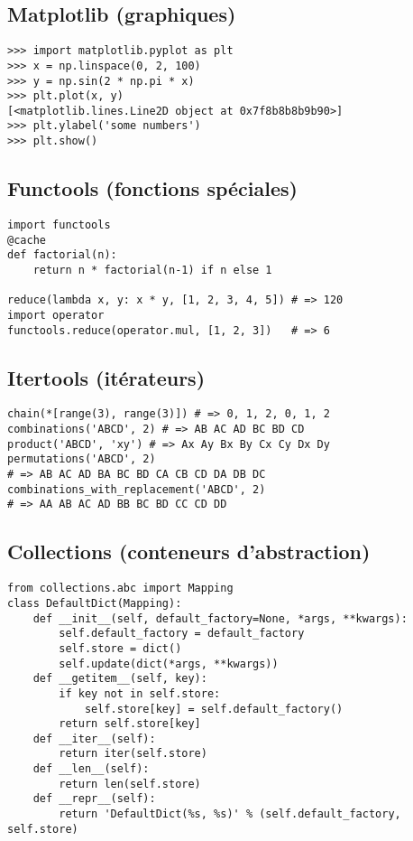 \documentclass{article}
\begin{document}
\begin{multicols*}{4}
\subsection*{Matplotlib (graphiques)}
\begin{lstlisting}
>>> import matplotlib.pyplot as plt
>>> x = np.linspace(0, 2, 100)
>>> y = np.sin(2 * np.pi * x)
>>> plt.plot(x, y)
[<matplotlib.lines.Line2D object at 0x7f8b8b8b9b90>]
>>> plt.ylabel('some numbers')
>>> plt.show()
\end{lstlisting}

\subsection*{Functools (fonctions spéciales)}
\begin{lstlisting}
import functools
@cache
def factorial(n):
    return n * factorial(n-1) if n else 1

reduce(lambda x, y: x * y, [1, 2, 3, 4, 5]) # => 120
import operator
functools.reduce(operator.mul, [1, 2, 3])   # => 6
\end{lstlisting}

\subsection*{Itertools (itérateurs)}
\begin{lstlisting}
chain(*[range(3), range(3)]) # => 0, 1, 2, 0, 1, 2
combinations('ABCD', 2) # => AB AC AD BC BD CD
product('ABCD', 'xy') # => Ax Ay Bx By Cx Cy Dx Dy
permutations('ABCD', 2)
# => AB AC AD BA BC BD CA CB CD DA DB DC
combinations_with_replacement('ABCD', 2)
# => AA AB AC AD BB BC BD CC CD DD
\end{lstlisting}

\subsection*{Collections (conteneurs d'abstraction)}
\begin{lstlisting}
from collections.abc import Mapping
class DefaultDict(Mapping):
    def __init__(self, default_factory=None, *args, **kwargs):
        self.default_factory = default_factory
        self.store = dict()
        self.update(dict(*args, **kwargs))
    def __getitem__(self, key):
        if key not in self.store:
            self.store[key] = self.default_factory()
        return self.store[key]
    def __iter__(self):
        return iter(self.store)
    def __len__(self):
        return len(self.store)
    def __repr__(self):
        return 'DefaultDict(%s, %s)' % (self.default_factory, self.store)
\end{lstlisting}


\end{multicols*}
\end{document}
